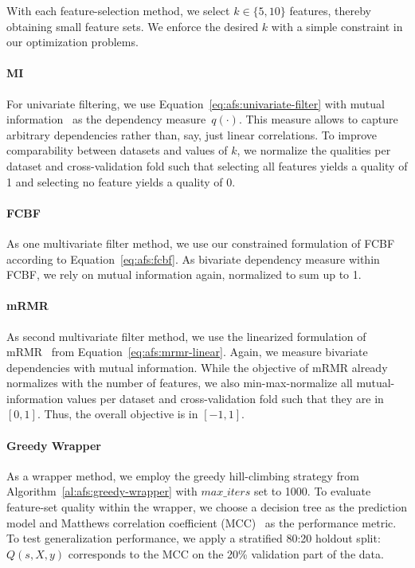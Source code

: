 \documentclass{article}
\theoremstyle{definition}
\begin{document}
With each feature-selection method, we select $k \in \{5,10\}$ features, thereby obtaining small feature sets.
We enforce the desired $k$ with a simple constraint in our optimization problems.

\paragraph{MI}

For univariate filtering, we use Equation~\ref{eq:afs:univariate-filter} with mutual information~\cite{kraskov2004estimating} as the dependency measure~$q(\cdot)$.
This measure allows to capture arbitrary dependencies rather than, say, just linear correlations.
To improve comparability between datasets and values of $k$, we normalize the qualities per dataset and cross-validation fold such that selecting all features yields a quality of 1 and selecting no feature yields a quality of 0.

\paragraph{FCBF}

As one multivariate filter method, we use our constrained formulation of FCBF~\cite{yu2003feature} according to Equation~\ref{eq:afs:fcbf}.
As bivariate dependency measure within FCBF, we rely on mutual information again, normalized to sum up to 1.

\paragraph{mRMR}

As second multivariate filter method, we use the linearized formulation of mRMR~\cite{peng2005feature} from Equation~\ref{eq:afs:mrmr-linear}.
Again, we measure bivariate dependencies with mutual information.
While the objective of mRMR already normalizes with the number of features, we also min-max-normalize all mutual-information values per dataset and cross-validation fold such that they are in $[0,1]$.
Thus, the overall objective is in $[-1,1]$.

\paragraph{Greedy Wrapper}

As a wrapper method, we employ the greedy hill-climbing strategy from Algorithm~\ref{al:afs:greedy-wrapper} with $max\_iters$ set to 1000.
To evaluate feature-set quality within the wrapper, we choose a decision tree as the prediction model and Matthews correlation coefficient (MCC)~\cite{matthews1975comparison} as the performance metric.
To test generalization performance, we apply a stratified 80:20 holdout split:
$Q(s,X,y)$ corresponds to the MCC on the 20\% validation part of the data.
\end{document}
